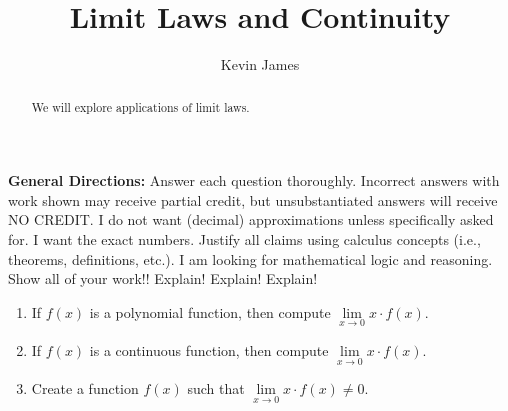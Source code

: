 \documentclass[handout,nooutcomes,noauthor,12pt]{ximera}
\author{Kevin James}
\title{Limit Laws and Continuity}
\begin{document}
	\begin{abstract}
		We will explore applications of limit laws.
	\end{abstract}
	\maketitle
	\textbf{General Directions:}  Answer each question thoroughly.  Incorrect answers with work shown may receive partial credit, but unsubstantiated answers will receive NO CREDIT.  I do not want (decimal) approximations unless specifically asked for.  I want the exact numbers.  Justify all claims using calculus concepts (i.e., theorems, definitions, etc.).  I am looking for mathematical logic and reasoning.  Show all of your work!! Explain!  Explain!  Explain!
	
	\begin{enumerate}[label=\arabic*.]
		\item If $f(x)$ is a polynomial function, then compute $\lim\limits_{x \to 0}x \cdot f(x)$.
		\item If $f(x)$ is a continuous function, then compute $\lim\limits_{x \to 0}x \cdot f(x)$.
		
		\clearpage
		
		\item Create a function $f(x)$ such that $\lim\limits_{x \to 0}x \cdot f(x) \ne 0$.
	\end{enumerate}
\end{document}

